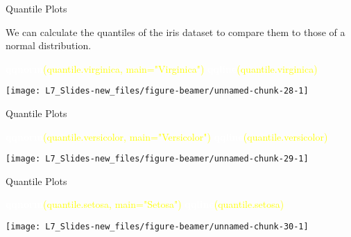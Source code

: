 \documentclass[ignorenonframetext,]{beamer}
\newenvironment{Shaded}{\begin{snugshade}}{\end{snugshade}}
\newcommand{\KeywordTok}[1]{\textcolor{white}{\textbf{{#1}}}}
\newcommand{\NormalTok}[1]{\textcolor{yellow}{{#1}}}
\newcommand{\DataTypeTok}[1]{\textcolor{yellow}{{#1}}}
\newcommand{\StringTok}[1]{\textcolor{yellow}{{#1}}}
\begin{document}
\begin{frame}[fragile]{Quantile Plots}

We can calculate the quantiles of the iris dataset to compare them to
those of a normal distribution.

\small

\small

\begin{Shaded}
\begin{Highlighting}[]
\KeywordTok{qqnorm}\NormalTok{(quantile.virginica, }\DataTypeTok{main=}\StringTok{"Virginica"}\NormalTok{)}
\KeywordTok{qqline}\NormalTok{(quantile.virginica)}
\end{Highlighting}
\end{Shaded}

\begin{center}\texttt{[image: L7\_Slides-new\_files/figure-beamer/unnamed-chunk-28-1]} \end{center}

\end{frame}

\begin{frame}[fragile]{Quantile Plots}

\small

\begin{Shaded}
\begin{Highlighting}[]
\KeywordTok{qqnorm}\NormalTok{(quantile.versicolor, }\DataTypeTok{main=}\StringTok{"Versicolor"}\NormalTok{)}
\KeywordTok{qqline}\NormalTok{(quantile.versicolor)}
\end{Highlighting}
\end{Shaded}

\begin{center}\texttt{[image: L7\_Slides-new\_files/figure-beamer/unnamed-chunk-29-1]} \end{center}

\end{frame}

\begin{frame}[fragile]{Quantile Plots}

\small

\begin{Shaded}
\begin{Highlighting}[]
\KeywordTok{qqnorm}\NormalTok{(quantile.setosa, }\DataTypeTok{main=}\StringTok{"Setosa"}\NormalTok{)}
\KeywordTok{qqline}\NormalTok{(quantile.setosa)}
\end{Highlighting}
\end{Shaded}

\begin{center}\texttt{[image: L7\_Slides-new\_files/figure-beamer/unnamed-chunk-30-1]} \end{center}

\end{frame}
\end{document}
